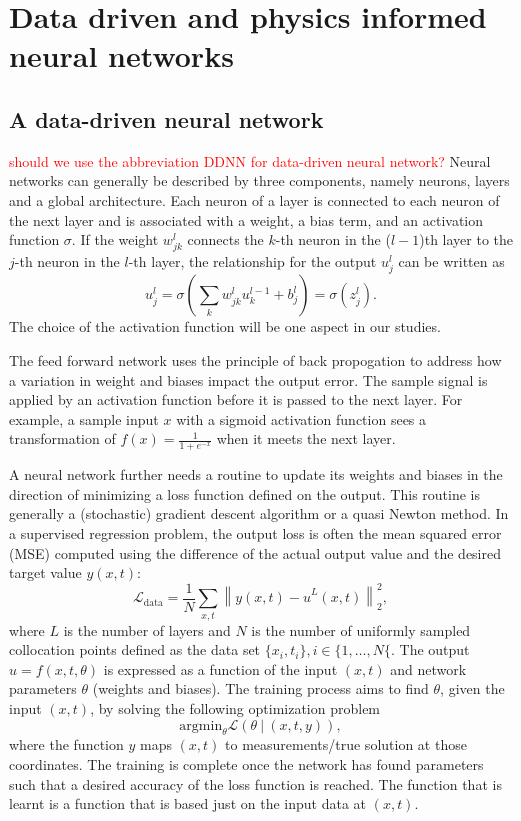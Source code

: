 \section{Data driven and physics informed neural networks}
\label{sec:neuralnets}

\subsection{A data-driven neural network}
\label{sec:vanillaNN}

\textcolor{red}{should we use the abbreviation DDNN for data-driven neural network?}
Neural networks can generally be described by three components, namely neurons, layers and a global
architecture. Each neuron of a layer is connected to each neuron of the next layer and is associated with a 
weight, a bias term, and an activation function $\sigma$. If the weight $w_{jk}^l$ connects the $k$-th 
neuron in the ($l-1$)th layer to the $j$-th neuron in the $l$-th layer, the relationship for the output 
$u_j^l$ can be written as
\[
u_j^l = \sigma\left(\sum_k w^l_{jk} u_k ^{l-1} + b_j^l\right) =  \sigma\left(z_j^l\right).
\] 
The choice of the activation function will be one aspect in our studies. 

The feed forward network uses the principle of back propogation to address how a variation in weight and biases impact the output error.  The sample signal is applied by an activation function before it is
passed to the next layer. For example, a sample input $x$ with a sigmoid activation function sees a transformation of $f(x) = \frac{1}{1+e^{-x}}$ when it meets the next layer. 

A neural network further needs a routine to update its weights and biases in the direction of minimizing a loss function defined on the output. This routine 
is generally a (stochastic) gradient descent algorithm or a quasi Newton method. In a supervised regression problem, the output loss is often the mean squared error (MSE) computed using the difference of the actual output value and the desired target value $y(x,t)$:
\begin{equation}\label{eq:fct_data}
\mathcal{L}_{\mathrm{data}}= \frac{1}{N} \sum_{x,t} \left\| y(x,t) - \hat{u}^L(x,t) \right\|_2^2,
\end{equation}
where $L$ is the number of layers and $N$ is the number of uniformly sampled collocation points defined 
as the data set $\{ x_i,t_i \}, i \in \{1, \ldots, N\{$.  The output $\hat{u} = f (x, t, \theta)$ is
expressed as a function of the input $(x, t)$ and network parameters $\theta$ (weights and biases).
The training process aims to find $\theta$, given the input $(x, t)$, by solving the following optimization problem 
\[
\mbox{argmin}_\theta \mathcal{L} \left(\theta\ | \ (x,t ,y)\right),
\]
where the function $y$ maps $(x, t)$ to measurements/true solution at those coordinates.
The training is complete once the network has found parameters such that a 
desired accuracy of the loss function is reached.
The function that is learnt is a function that is based just on the input data at $(x,t)$. 

